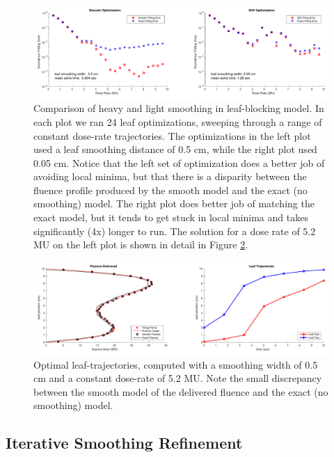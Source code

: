\begin{figure}
  \centering
  \includegraphics[width=\textwidth]{fig/smoothVsStiffOptimization.pdf}
  \caption{Comparison of heavy and light smoothing in leaf-blocking model.
           In each plot we ran 24 leaf optimizations, sweeping through a range of constant dose-rate trajectories.
           The optimizations in the left plot used a leaf smoothing distance of 0.5 cm, while the
           right plot used 0.05 cm.
           Notice that the left set of optimization does a better job of avoiding local minima,
           but that there is a disparity between the fluence profile produced by the smooth model
           and the exact (no smoothing) model.
           The right plot does better job of matching the exact model, but it tends to get stuck in local minima
           and takes significantly (4x) longer to run.
           The solution for a dose rate of 5.2 MU on the left plot is
           shown in detail in Figure \ref{fig:fluenceMapSmoothingExample}.
          }
  \label{fig:smoothVsStiffOptimization}
\end{figure}

\begin{figure}
  \centering
  \includegraphics[width=\textwidth]{fig/fluenceMapSmoothingExample.pdf}
  \caption{ Optimal leaf-trajectories, computed with a smoothing width of 0.5 cm and a constant
            dose-rate of 5.2 MU. Note the small discrepancy between the smooth model of the
            delivered fluence and the exact (no smoothing) model.}
  \label{fig:fluenceMapSmoothingExample}
\end{figure}


\subsection{Iterative Smoothing Refinement}

